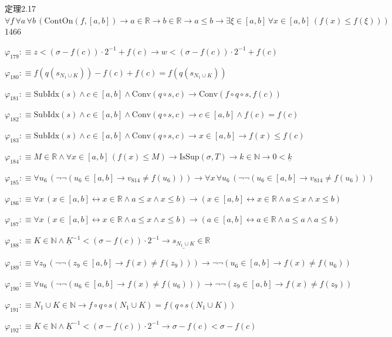 \begin{fullproof}{定理2.17}{$\forall f\,\forall a\,\forall b\,(\mathrm{ContOn}(f,[a,b]) \to a \in \mathbb{R} \to b \in \mathbb{R} \to a \leq b \to \exists \xi \in [a,b]\,\forall x \in [a,b]\,(f(x) \leq f(\xi)))$}{1466}
\begin{abbrevlist}
\item $\varphi_{179} :\equiv z < (\sigma - f(c)) \cdot 2^{-1} + f(c) \to w < (\sigma - f(c)) \cdot 2^{-1} + f(c)$
\item $\varphi_{180} :\equiv f(q(s_{N_{1} \cup K})) - f(c) + f(c) = f(q(s_{N_{1} \cup K}))$
\item $\varphi_{181} :\equiv \mathrm{SubIdx}(s) \land c \in [a,b] \land \mathrm{Conv}(q \circ s,c) \to \mathrm{Conv}(f \circ q \circ s,f(c))$
\item $\varphi_{182} :\equiv \mathrm{SubIdx}(s) \land c \in [a,b] \land \mathrm{Conv}(q \circ s,c) \to c \in [a,b] \land f(c) = f(c)$
\item $\varphi_{183} :\equiv \mathrm{SubIdx}(s) \land c \in [a,b] \land \mathrm{Conv}(q \circ s,c) \to x \in [a,b] \to f(x) \leq f(c)$
\item $\varphi_{184} :\equiv M \in \mathbb{R} \land \forall x \in [a,b]\,(f(x) \leq M) \to \mathrm{IsSup}(\sigma,T) \to k \in \mathbb{N} \to 0 < \underline{k}$
\item $\varphi_{185} :\equiv \forall u_{6}\,(\neg \neg (u_{6} \in [a,b] \to v_{814} \neq f(u_{6}))) \to \forall x\,\forall u_{6}\,(\neg \neg (u_{6} \in [a,b] \to v_{814} \neq f(u_{6})))$
\item $\varphi_{186} :\equiv \forall x\,(x \in [a,b] \leftrightarrow x \in \mathbb{R} \land a \leq x \land x \leq b) \to (x \in [a,b] \leftrightarrow x \in \mathbb{R} \land a \leq x \land x \leq b)$
\item $\varphi_{187} :\equiv \forall x\,(x \in [a,b] \leftrightarrow x \in \mathbb{R} \land a \leq x \land x \leq b) \to (a \in [a,b] \leftrightarrow a \in \mathbb{R} \land a \leq a \land a \leq b)$
\item $\varphi_{188} :\equiv K \in \mathbb{N} \land \underline{K}^{-1} < (\sigma - f(c)) \cdot 2^{-1} \to \underline{s_{N_{1} \cup K}} \in \mathbb{R}$
\item $\varphi_{189} :\equiv \forall z_{9}\,(\neg \neg (z_{9} \in [a,b] \to f(x) \neq f(z_{9}))) \to \neg \neg (u_{6} \in [a,b] \to f(x) \neq f(u_{6}))$
\item $\varphi_{190} :\equiv \forall u_{6}\,(\neg \neg (u_{6} \in [a,b] \to f(x) \neq f(u_{6}))) \to \neg \neg (z_{9} \in [a,b] \to f(x) \neq f(z_{9}))$
\item $\varphi_{191} :\equiv N_{1} \cup K \in \mathbb{N} \to f \circ q \circ s(N_{1} \cup K) = f(q \circ s(N_{1} \cup K))$
\item $\varphi_{192} :\equiv K \in \mathbb{N} \land \underline{K}^{-1} < (\sigma - f(c)) \cdot 2^{-1} \to \sigma - f(c) < \sigma - f(c)$

\end{abbrevlist}
\end{fullproof}
